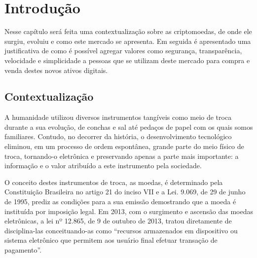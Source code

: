 \chapter{Introdução}

Nesse capítulo será feita uma contextualização sobre as criptomoedas, de onde ele surgiu, evoluiu e como este mercado se apresenta. Em seguida é apresentado uma justificativa de como é possível agregar valores como segurança, transparência, velocidade e simplicidade a pessoas que se utilizam deste mercado para compra e venda destes novos ativos digitais.

\section{Contextualização}


A humanidade utilizou diversos instrumentos tangíveis como meio de troca durante a sua evolução, de conchas e sal até pedaços de papel com os quais somos familiares. Contudo, no decorrer da história, o desenvolvimento tecnológico eliminou, em um processo de ordem espontânea, grande parte do meio físico de troca, tornando-o eletrônica e preservando apenas a parte mais importante: a informação e o valor atribuído a este instrumento pela sociedade. 

O conceito destes instrumentos de troca, as moedas, é determinado pela Constituição Brasileira no artigo 21 do inciso VII e a Lei. 9.069, de 29 de junho de 1995, prediz as condições para a sua emissão demostrando que a moeda é instituída por imposição legal. Em 2013, com o surgimento e ascensão das moedas eletrônicas, a lei nº 12.865, de 9 de outubro de 2013, tratou diretamente de disciplina-las conceituando-as como “recursos armazenados em dispositivo ou sistema eletrônico que permitem aos usuário final efetuar transação de pagamento”.

